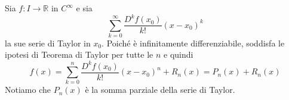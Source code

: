 \documentclass[a4paper]{article}
\begin{document}





Sia \(f\colon I \to \mathbb{R}\) in \(C^\infty\)
e sia
\[
    \sum_{k=0}^\infty \frac{D^kf(x_0)}{k!}{(x-x_0)}^k
\]
la sue serie di Taylor in \(x_0\).
Poiché è infinitamente differenziabile, soddisfa le ipotesi di Teorema di Taylor per tutte
le \(n\) e quindi
\[
    f(x) = \sum_{k=0}^n \frac{D^kf(x_0)}{k!}{(x-x_0)}^n + R_n(x)
    = P_n(x) + R_n(x)
\]
Notiamo che \(P_n(x)\) è la somma parziale della serie di Taylor.
\end{document}
